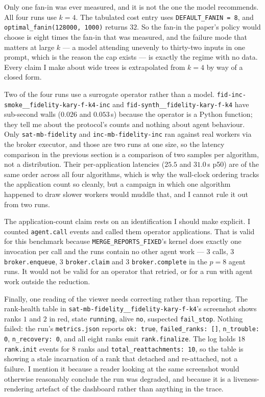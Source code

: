 \documentclass[11pt]{article}
\begin{document}
Only one fan-in was ever measured, and it is not the one the model recommends. All four runs use
$k=4$. The tabulated cost entry uses \texttt{DEFAULT\_FANIN = 8}, and
\texttt{optimal\_fanin(128000, 1000)} returns $32$. So the fan-in the paper's policy would
choose is eight times the fan-in that was measured, and the failure mode that matters at large
$k$ --- a model attending unevenly to thirty-two inputs in one prompt, which is the reason the
cap exists --- is exactly the regime with no data. Every claim I make about wide trees is
extrapolated from $k=4$ by way of a closed form.

Two of the four runs use a surrogate operator rather than a model.
\texttt{fid-inc-smoke\_\_fidelity-kary-f-k4-inc} and \texttt{fid-synth\_\_fidelity-kary-f-k4}
have sub-second walls ($0.026$ and $0.053$\,s) because the operator is a Python function; they
tell me about the protocol's counts and nothing about agent behaviour. Only
\texttt{sat-mb-fidelity} and \texttt{inc-mb-fidelity-inc} ran against real workers via the
broker executor, and those are two runs at one size, so the latency comparison in the previous
section is a comparison of two samples per algorithm, not a distribution. Their per-application
latencies ($25.5$ and $31.0$\,s p50) are of the same order across all four algorithms, which is
why the wall-clock ordering tracks the application count so cleanly, but a campaign in which
one algorithm happened to draw slower workers would muddle that, and I cannot rule it out from
two runs.

The application-count claim rests on an identification I should make explicit. I counted
\texttt{agent.call} events and called them operator applications. That is valid for this
benchmark because \texttt{MERGE\_REPORTS\_FIXED}'s kernel does exactly one invocation per call
and the runs contain no other agent work --- $3$ calls, $3$ \texttt{broker.enqueue}, $3$
\texttt{broker.claim} and $3$ \texttt{broker.complete} in the $p=8$ agent runs. It would not be
valid for an operator that retried, or for a run with agent work outside the reduction.

Finally, one reading of the viewer needs correcting rather than reporting. The rank-health table
in \texttt{sat-mb-fidelity\_\_fidelity-kary-f-k4}'s screenshot shows ranks $1$ and $2$ in red,
state \texttt{running}, alive \texttt{no}, suspected \texttt{fail\_stop}. Nothing failed: the
run's \texttt{metrics.json} reports \texttt{ok: true}, \texttt{failed\_ranks: []},
\texttt{n\_trouble: 0}, \texttt{n\_recovery: 0}, and all eight ranks emit
\texttt{rank.finalize}. The log holds $18$ \texttt{rank.init} events for $8$ ranks and
\texttt{total\_reattachments: 10}, so the table is showing a stale incarnation of a rank that
detached and re-attached, not a failure. I mention it because a reader looking at the same
screenshot would otherwise reasonably conclude the run was degraded, and because it is a
liveness-rendering artefact of the dashboard rather than anything in the trace.
\end{document}
